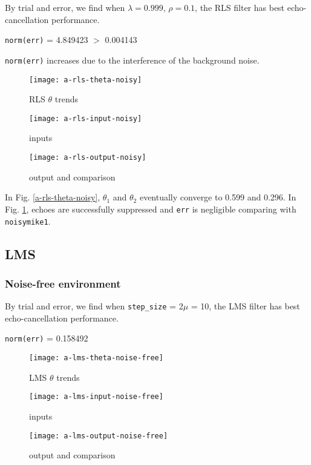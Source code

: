 \documentclass{article}
\begin{document}
By trial and error, we find when $\lambda = 0.999$, $\rho = 0.1$, the RLS filter has best echo-cancellation performance.
\begin{center}
\texttt{norm(err)} = 4.849423 $>$ 0.004143
\end{center}
\texttt{norm(err)} increases due to the interference of the background noise.

\begin{figure}[H]
\begin{minipage}[t]{0.33\linewidth}
\centering
\texttt{[image: a-rls-theta-noisy]}
\caption{RLS $\theta$ trends}
\label{a-rls-theta-noisy}
\end{minipage}
\begin{minipage}[t]{0.33\linewidth}
\centering
\texttt{[image: a-rls-input-noisy]}
\caption{inputs}
\end{minipage}
\begin{minipage}[t]{0.33\linewidth}
\centering
\texttt{[image: a-rls-output-noisy]}
\caption{output and comparison}
\label{a-rls-output-noisy}
\end{minipage}
\end{figure}

In Fig. \ref{a-rls-theta-noisy}, $\theta_1$ and $\theta_2$ eventually converge to 0.599 and 0.296. In Fig. \ref{a-rls-output-noisy}, echoes are successfully suppressed and \texttt{err} is negligible comparing with \texttt{noisymike1}.


\subsection*{LMS}

\subsubsection*{Noise-free environment}

By trial and error, we find when \texttt{step\_size} = 2$\mu$ = 10, the LMS filter has best echo-cancellation performance.
\begin{center}
\texttt{norm(err)} = 0.158492
\end{center}

\begin{figure}[H]
\begin{minipage}[t]{0.33\linewidth}
\centering
\texttt{[image: a-lms-theta-noise-free]}
\caption{LMS $\theta$ trends}
\label{a-lms-theta-noise-free}
\end{minipage}
\begin{minipage}[t]{0.33\linewidth}
\centering
\texttt{[image: a-lms-input-noise-free]}
\caption{inputs}
\end{minipage}
\begin{minipage}[t]{0.33\linewidth}
\centering
\texttt{[image: a-lms-output-noise-free]}
\caption{output and comparison}
\label{a-lms-output-noise-free}
\end{minipage}
\end{figure}
\end{document}

